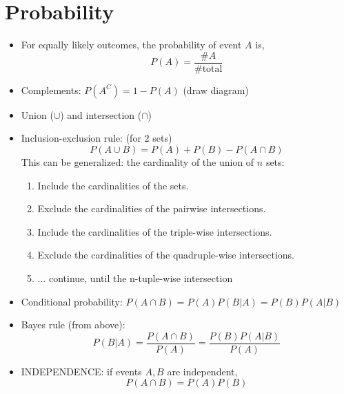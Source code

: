 \documentclass[12pt]{article}
\numberwithin{equation}{section}
\begin{document}
\section{Probability}
\begin{itemize}
	\item For equally likely outcomes, the probability of event $ A $ is,
	\begin{equation}
			P(A) = \frac{\# A}{\# \text{total}}
	\end{equation}
	\item Complements: $ P(A^C)  = 1-P(A)$ (draw diagram)
	\item Union ($ \cup $) and intersection ($ \cap $)
	\item Inclusion-exclusion rule: (for 2 sets)
	\begin{equation}
			P(A \cup B) = P(A) + P(B) - P(A\cap B)
	\end{equation}
	This can be generalized: the cardinality of the union of $ n $ sets:
	\begin{enumerate}
		\item Include the cardinalities of the sets.
		\item Exclude the cardinalities of the pairwise intersections.
		\item Include the cardinalities of the triple-wise intersections.
		\item Exclude the cardinalities of the quadruple-wise intersections.
		\item $ \dots $ continue, until the n-tuple-wise intersection
	\end{enumerate}
	\item Conditional probability: $ P(A\cap B)  = P(A)P(B|A) = P(B)P(A|B)$
	\item Bayes rule (from above):
	\begin{equation}
			P(B|A) = \frac{ P(A\cap B) }{P(A)} = \frac{P(B)P(A|B)}{P(A)} 
	\end{equation}
	\item INDEPENDENCE: if events $ A,B $ are independent,
	\begin{equation}
			P(A\cap B) = P(A)P(B)
	\end{equation}
\end{itemize}
\end{document}
